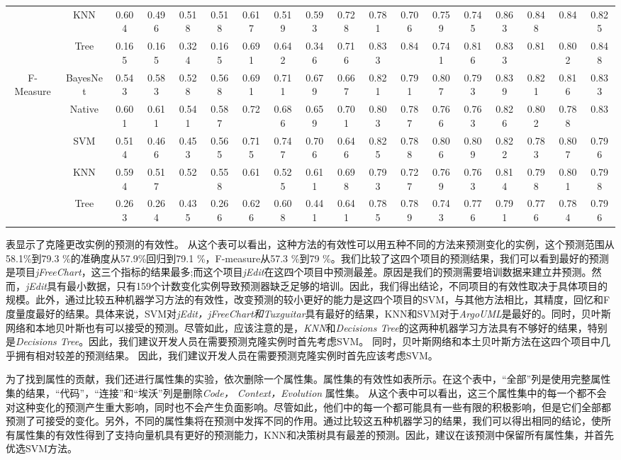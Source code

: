 {{\begin{table*}[htbp]
\begin{tabular}{cccccccccccccccccc}
&KNN&	0.604	&0.496	&0.518	&0.518		&0.617	&0.519	&0.593	&0.728		&0.781	&0.706	&0.759	&0.745		&0.863	&0.848	&0.84	&0.825\\
&Tree&	0.165	&0.165	&0.324	&0.165		&0.691	&0.642	&0.346	&0.716		&0.833	&0.84	&0.741	&0.816		&0.833	&0.81	&0.802	&0.848\\
\hline
\multirow{5}{*}{F-Measure}
&BayesNet&0.543	&0.583	&0.528	&0.568		&0.691	&0.711	&0.679	&0.667		&0.821	&0.791	&0.807	&0.793		&0.839	&0.821	&0.816	&0.833\\
&Native&0.601	&0.611	&0.541	&0.587		&0.72	&0.686	&0.659	&0.701		&0.803	&0.787	&0.766	&0.763		&0.826	&0.802	&0.788	&0.83\\
&SVM&	0.514	&0.466	&0.453	&0.565		&0.715	&0.747	&0.706	&0.646		&0.825	&0.788	&0.806	&0.809		&0.822	&0.783	&0.807	&0.796\\
&KNN&	0.594	&0.517	&0.52	&0.558		&0.61	&0.525	&0.611	&0.698		&0.793	&0.727	&0.769	&0.763		&0.814	&0.798	&0.801	&0.798\\
&Tree&	0.263	&0.264	&0.435	&0.266		&0.626	&0.608	&0.441	&0.641		&0.785	&0.789	&0.743	&0.776		&0.791	&0.776	&0.784	&0.796\\
\bottomrule[1.5pt]
\end{tabular}
\end{table*}


表显示了克隆更改实例的预测的有效性。
从这个表可以看出，这种方法的有效性可以用五种不同的方法来预测变化的实例，这个预测范围从58.1\%到79.3 \%的准确度从57.9\%回归到79.1 \%，F-measure从57.3 \%到79 \%。我们比较了这四个项目的预测结果，我们可以看到最好的预测是项目{\em  jFreeChart}，这三个指标的结果最多;而这个项目{\em jEdit}在这四个项目中预测最差。原因是我们的预测需要培训数据来建立井预测。然而，{\em jEdit}具有最小数据，只有159个计数变化实例导致预测器缺乏足够的培训。因此，我们得出结论，不同项目的有效性取决于具体项目的规模。此外，通过比较五种机器学习方法的有效性，改变预测的较小更好的能力是这四个项目的SVM，与其他方法相比，其精度，回忆和F度量度最好的结果。具体来说，SVM对{\em jEdit，jFreeChart和Tuxguitar}具有最好的结果，KNN和SVM对于{\em ArgoUML}是最好的。同时，贝叶斯网络和本地贝叶斯也有可以接受的预测。尽管如此，应该注意的是，{\em KNN}和{\em Decisions Tree}的这两种机器学习方法具有不够好的结果，特别是{\em Decisions Tree}。因此，我们建议开发人员在需要预测克隆实例时首先考虑SVM。
同时，贝叶斯网络和本土贝叶斯方法在这四个项目中几乎拥有相对较差的预测结果。
因此，我们建议开发人员在需要预测克隆实例时首先应该考虑SVM。

为了找到属性的贡献，我们还进行属性集的实验，依次删除一个属性集。属性集的有效性如表所示。在这个表中，“全部”列是使用完整属性集的结果，“代码”，“连接”和“埃沃”列是删除{\em Code， Context，Evolution }属性集。
从这个表中可以看出，这三个属性集中的每一个都不会对这种变化的预测产生重大影响，同时也不会产生负面影响。尽管如此，他们中的每一个都可能具有一些有限的积极影响，但是它们全部都预测了可接受的变化。另外，不同的属性集将在预测中发挥不同的作用。通过比较这五种机器学习的结果，我们可以得出相同的结论，使所有属性集的有效性得到了支持向量机具有更好的预测能力，KNN和决策树具有最差的预测。因此，建议在该预测中保留所有属性集，并首先优选SVM方法。


}}

